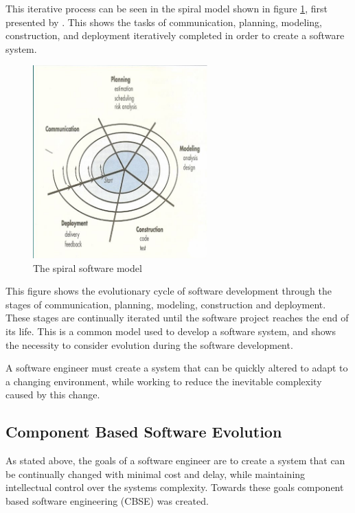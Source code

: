 This iterative process can be seen in the spiral model shown in figure \ref{spiral}, first presented by \cite{Boehm1988}.
This shows the tasks of communication, planning, modeling, construction, and deployment iteratively completed in order to create a software system.
\begin{figure}[h!]
\begin{center}
  \includegraphics[width=0.6\textwidth]{backgroundpics/spiral}
  \caption{The spiral software model}
  \label{spiral}
\end{center}
\end{figure}

This figure shows the evolutionary cycle of software development through the stages of communication, planning, modeling, construction and deployment.
These stages are continually iterated  until the software project reaches the end of its life. 
This is a common model used to develop a software system, and shows the necessity to consider evolution during the software development.  

A software engineer must create a system that can be quickly altered to adapt to a changing environment, 
while working to reduce the inevitable complexity caused by this change.

\subsection{Component Based Software Evolution}
As stated above, the goals of a software engineer are to create a system that can be continually changed with minimal cost and delay,
while maintaining intellectual control over the systems complexity.
Towards these goals component based software engineering (CBSE) was created.


